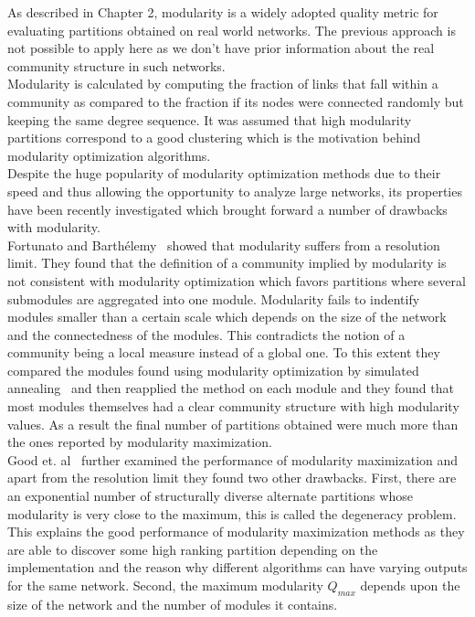 \begin{spacing}{1.5}
As described in Chapter 2, modularity is a widely adopted quality metric for evaluating partitions obtained on real world networks. The previous approach is not possible to apply here as we don't have prior information about the real community structure in such networks.\\
\indent Modularity is calculated by computing the fraction of links that fall within a community as compared to the fraction if its nodes were connected randomly but keeping the same degree sequence. It was assumed that high modularity partitions correspond to a good clustering which is the motivation behind modularity optimization algorithms.\\ 
\indent Despite the huge popularity of modularity optimization methods due to their speed and thus allowing the opportunity to analyze large networks, its properties have been recently investigated which brought forward a number of drawbacks with modularity.\\
\indent Fortunato and Barth\'{e}lemy~\cite{Fortunato02012007} showed that modularity suffers from a resolution limit. They found that the definition of a community implied by modularity is not consistent with modularity optimization which favors partitions where several submodules are aggregated into one module. Modularity fails to indentify modules smaller than a certain scale which depends on the size of the network and the connectedness of the modules. This contradicts the notion of a community being a local measure instead of a global one. To this extent they compared the modules found using modularity optimization by simulated annealing~\cite{Guimera04simulatedAnnealingNetworks} and then reapplied the method on each module and they found that most modules themselves had a clear community structure with high modularity values. As a result the final number of partitions obtained were much more than the ones reported by modularity maximization.\\
\indent Good et. al~\cite{PhysRevE.81.046106} further examined the performance of modularity maximization and apart from the resolution limit they found two other drawbacks. First, there are an exponential number of structurally diverse alternate partitions whose modularity is very close to the maximum, this is called the degeneracy problem. This explains the good performance of modularity maximization methods as they are able to discover some high ranking partition depending on the implementation and the reason why different algorithms can have varying outputs for the same network. Second, the maximum modularity $Q_{max}$ depends upon the size of the network and the number of modules it contains.
\end{spacing}